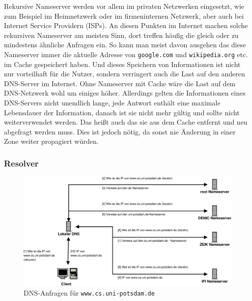 \documentclass[a4paper, 12pt, BCOR10mm, DIV12, toc=bibliography, toc=listof, german]{scrbook}
\begin{document}
			Rekursive Nameserver werden vor allem im privaten Netzwerken eingesetzt, wie zum Beispiel im
			Heimnetzwerk oder im firmeninternen Netzwerk, aber auch bei Internet Service Providern
			(ISPs). An diesen Punkten im Internet machen solche rekursiven Nameserver am meisten Sinn,
			dort treffen häufig die gleich oder zu mindestens ähnliche Anfragen ein. So kann man meist
			davon ausgehen das diese Nameserver immer die aktuelle Adresse von \texttt{google.com} und
			\texttt{wikipedia.org} etc. im Cache gespeichert haben. Und dieses Speichern von Informationen
			ist nicht nur vorteilhaft für die Nutzer, sondern verringert auch die Last auf den anderen
			DNS-Server im Internet. Ohne Nameserver mit Cache wäre die Last auf dem DNS-Netzwerk wohl um
			einiges höher. Allerdings gelten die Informationen eines DNS-Servers nicht unendlich lange,
			jede Antwort enthält eine maximale Lebensdauer der Information, danach ist sie nicht mehr
			gültig und sollte nicht weiterverwendet werden. Das heißt auch das sie aus dem Cache entfernt
			und neu abgefragt werden muss. Dies ist jedoch nötig, da sonst nie Änderung in einer Zone
			weiter propagiert würden.


			\subsubsection*{Resolver} %

				\begin{figure}
					\centering
					\includegraphics[width=\textwidth]{images/request}
					\caption{DNS-Anfragen für \texttt{www.cs.uni-potsdam.de}} %
					\label{fig:bsp-request}
				\end{figure}
\end{document}
